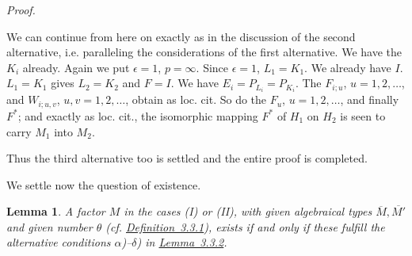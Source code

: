 \documentclass[b5paper,twoside]{article}
\newcommand{\lemref}[2]{\hyperref[#1]{\mbox{Lemma~#2}}}
\newcommand{\defref}[2]{\hyperref[#1]{\mbox{Definition~#2}}}
\theoremstyle{mvnplain}
\newtheorem{lemma}{Lemma}[section]
\renewenvironment{proof}[1][Proof]{%
  \par\addvspace{0.35\baselineskip}%
  \noindent\textit{#1.}\ \normalfont\ignorespaces
}{%
  \par\addvspace{0.35\baselineskip}%
}
\newcommand{\M}{\mathbf M}
\newcommand{\Hilbert}{\mathfrak H}
\def\M{M}%
\def\Hilbert{H}%
\def\mathfrak#1{#1}%
\begin{document}
\begin{proof}
We can continue from here on exactly as in the discussion of the second
alternative, i.e. paralleling the considerations of the first alternative. We
have the \(\mathfrak K_i\) already. Again we put \(\epsilon=1\),
\(p=\infty\). Since \(\epsilon=1\),
\(\mathfrak L_1=\mathfrak K_1\). We already have \(\mathfrak I\).
\(\mathfrak L_1=\mathfrak K_1\) gives
\(\mathfrak L_2=\mathfrak K_2\) and \(\mathfrak F=\mathfrak I\). We have
\(E_i=P_{\mathfrak L_i}=P_{\mathfrak K_i}\). The \(F_{i;u}\),
\(u=1,2,\ldots\), and \(W_{i;u,v}\), \(u,v=1,2,\ldots\), obtain as loc.
cit. So do the \(\mathfrak F_u\), \(u=1,2,\ldots\), and finally
\(\mathfrak F^*\); and exactly as loc. cit., the isomorphic mapping
\(\mathfrak F^*\) of \(\Hilbert_1\) on \(\Hilbert_2\) is seen to carry
\(\M_1\) into \(\M_2\).

Thus the third alternative too is settled and the entire proof is completed.
\end{proof}

We settle now the question of existence.

\begin{lemma}\label{lem:3.3.4}
A factor \(\M\) in the cases (I) or (II), with given algebraical types
\(\overline{\M},\overline{\M'}\) and given number \(\theta\) (cf.
\defref{def:3.3.1}{3.3.1}), exists if and only if these fulfill the alternative
conditions \(\alpha\))--\(\delta\)) in \lemref{lem:3.3.2}{3.3.2}.
\end{lemma}
\end{document}
